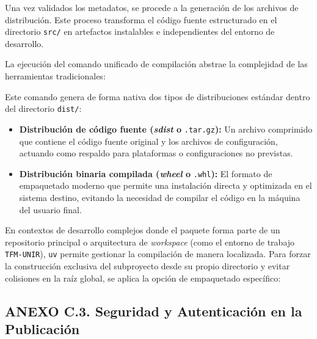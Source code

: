 Una vez validados los metadatos, se procede a la generación de los
archivos de distribución. Este proceso transforma el código fuente
estructurado en el directorio \texttt{src/} en artefactos instalables e
independientes del entorno de desarrollo.

La ejecución del comando unificado de compilación abstrae la complejidad
de las herramientas tradicionales:

\begin{Shaded}
\begin{Highlighting}[]
\end{Highlighting}
\end{Shaded}

Este comando genera de forma nativa dos tipos de distribuciones estándar
dentro del directorio \texttt{dist/}:

\begin{itemize}
\tightlist
\item
  \textbf{Distribución de código fuente (\emph{sdist} o}
  \texttt{.tar.gz}\textbf{):} Un archivo comprimido que contiene el
  código fuente original y los archivos de configuración, actuando como
  respaldo para plataformas o configuraciones no previstas.
\item
  \textbf{Distribución binaria compilada (\emph{wheel} o}
  \texttt{.whl}\textbf{):} El formato de empaquetado moderno que permite
  una instalación directa y optimizada en el sistema destino, evitando
  la necesidad de compilar el código en la máquina del usuario final.
\end{itemize}

En contextos de desarrollo complejos donde el paquete forma parte de un
repositorio principal o arquitectura de \emph{workspace} (como el
entorno de trabajo \texttt{TFM-UNIR}), \texttt{uv} permite gestionar la
compilación de manera localizada. Para forzar la construcción exclusiva
del subproyecto desde su propio directorio y evitar colisiones en la
raíz global, se aplica la opción de empaquetado específico:

\begin{Shaded}
\begin{Highlighting}[]
\end{Highlighting}
\end{Shaded}

\subsection{ANEXO C.3. Seguridad y Autenticación en la
Publicación}\label{anexo-c.3.-seguridad-y-autenticaciuxf3n-en-la-publicaciuxf3n}

